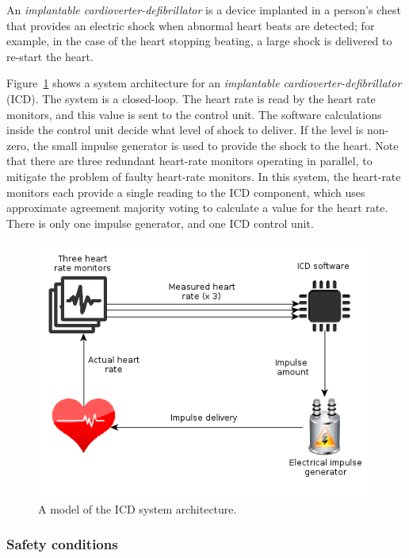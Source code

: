 

An  \emph{implantable cardioverter-defibrillator}  is a device implanted in a person's chest that provides an electric shock when abnormal heart beats are detected; for example, in the case of the heart stopping beating, a large shock is delivered to re-start the heart.

Figure~\ref{fig:icd-loop} shows a system architecture for an \emph{implantable cardioverter-defibrillator} (ICD). The system is a closed-loop. The heart rate is read by the heart rate monitors, and this value is sent to the control unit. The software calculations inside the control unit decide what level of shock to deliver. If the level is non-zero, the small impulse generator is used to provide the shock to the heart. 
Note that there are three redundant heart-rate monitors operating in parallel, to mitigate the problem of faulty heart-rate monitors. In this system, the heart-rate monitors each provide a single reading to the ICD component, which uses approximate agreement majority voting to calculate a value for the heart rate. There is only one impulse generator, and one ICD control unit.

\begin{figure}[!h]
\centering
\includegraphics[scale=0.6]{./figs/icd-loop}
\caption{A model of the ICD system architecture.}
\label{fig:icd-loop}
\end{figure}


\subsubsection*{Safety conditions}


